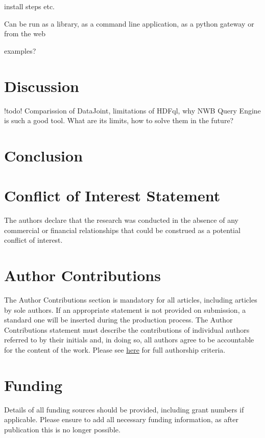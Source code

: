 \documentclass[utf8]{frontiersSCNS} %
\begin{document}
install steps etc.

Can be run as a library, as a command line application, as a python gateway or from the web

examples?

\section{Discussion}
\label{Discussion}

!todo! Comparission of DataJoint, limitations of HDFql, why NWB Query Engine is such a good tool. What are its limits, how to solve them in the future?

\section{Conclusion}


\section*{Conflict of Interest Statement}

The authors declare that the research was conducted in the absence of any commercial or financial relationships that could be construed as a potential conflict of interest.

\section*{Author Contributions}

The Author Contributions section is mandatory for all articles, including articles by sole authors. If an appropriate statement is not provided on submission, a standard one will be inserted during the production process. The Author Contributions statement must describe the contributions of individual authors referred to by their initials and, in doing so, all authors agree to be accountable for the content of the work. Please see  \href{http://home.frontiersin.org/about/author-guidelines#AuthorandContributors}{here} for full authorship criteria.

\section*{Funding}
Details of all funding sources should be provided, including grant numbers if applicable. Please ensure to add all necessary funding information, as after publication this is no longer possible.
\end{document}
